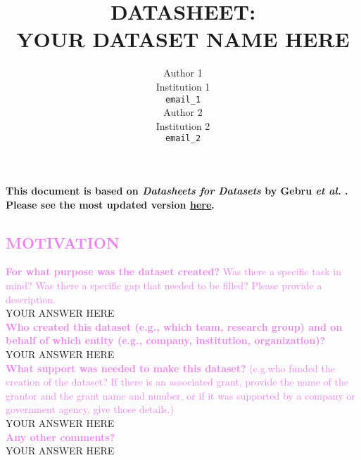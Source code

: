 \documentclass[letterpaper, 10 pt, conference]{ieeeconf}
\title{\LARGE \bf
    DATASHEET: \\
    YOUR DATASET NAME HERE
}
\author
{
    \parbox{0.45\textwidth}{
        \centering
        Author 1 \\
        Institution 1 \\
        {\tt\small
            email\_1
        }
    }
    \hspace*{0.1\textwidth}
    \parbox{0.45\textwidth}{
        \centering
        Author 2 \\
        Institution 2 \\
        {\tt\small
            email\_2
        }
    }
}
\newcommand{\sectioncolor}{violet}
\begin{document}
\maketitle
\thispagestyle{empty}
\pagestyle{empty}


\noindent
\textbf{
This document is based on \textit{Datasheets for Datasets} by Gebru \textit{et
al.} \cite{gebruDatasheetsDatasets2020}. Please see the most updated version
\underline{\textcolor{blue}{\href{http://arxiv.org/abs/1803.09010}{here}}}.
}


\begin{mdframed}[linecolor=\sectioncolor]
\section*{\textcolor{\sectioncolor}{
    MOTIVATION
}}
\end{mdframed}

    \textcolor{\sectioncolor}{\textbf{
    For what purpose was the dataset created?
    }
    Was there a specific task in mind? Was there
    a specific gap that needed to be filled? Please provide a description.
    } \\
    YOUR ANSWER HERE \\
    
    \textcolor{\sectioncolor}{\textbf{
    Who created this dataset (e.g., which team, research group) and on behalf
    of which entity (e.g., company, institution, organization)?
    }
    } \\
    YOUR ANSWER HERE \\
    
    \textcolor{\sectioncolor}{\textbf{
    What support was needed to make this dataset?
    }
    (e.g.who funded the creation of the dataset? If there is an associated
    grant, provide the name of the grantor and the grant name and number, or if
    it was supported by a company or government agency, give those details.)
    } \\
    YOUR ANSWER HERE \\
    
    \textcolor{\sectioncolor}{\textbf{
    Any other comments?
    }} \\
    YOUR ANSWER HERE \\
\end{document}
